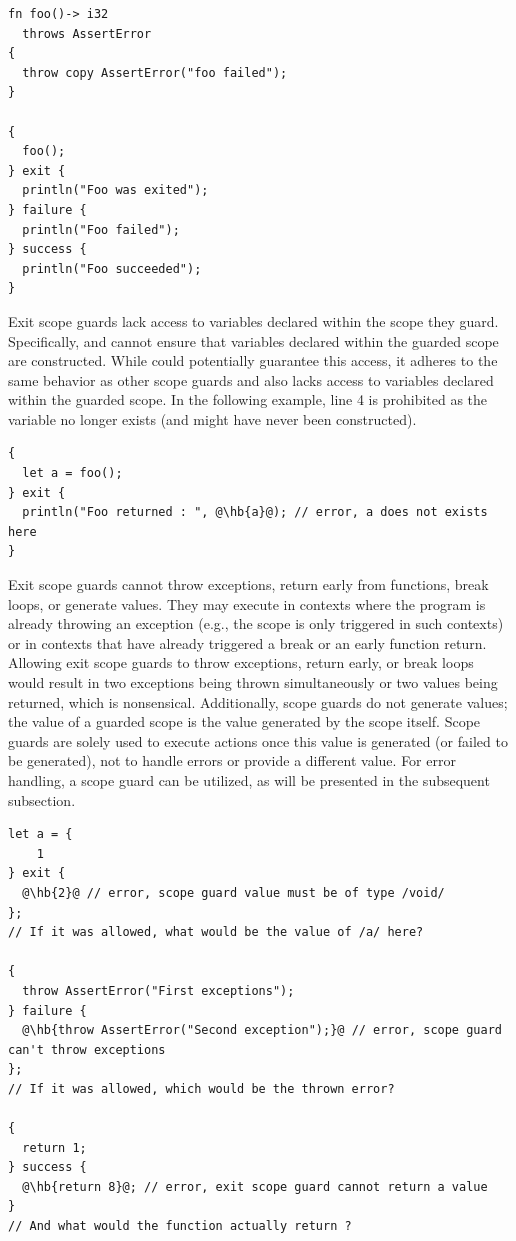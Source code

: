 \begin{lstlisting}[style=coloredverbatim]
fn foo()-> i32
  throws AssertError
{
  throw copy AssertError("foo failed");
}

{
  foo();
} exit {
  println("Foo was exited");
} failure {
  println("Foo failed");
} success {
  println("Foo succeeded");
}
\end{lstlisting}

Exit scope guards lack access to variables declared within the scope they guard.
Specifically,  and  cannot ensure that variables
declared within the guarded scope are constructed. While  could
potentially guarantee this access, it adheres to the same behavior as other
scope guards and also lacks access to variables declared within the guarded
scope. In the following example, line 4 is prohibited as the variable 
no longer exists (and might have never been constructed).

\begin{lstlisting}[style=coloredverbatim, escapechar=@]
{
  let a = foo();
} exit {
  println("Foo returned : ", @\hb{a}@); // error, a does not exists here
}
\end{lstlisting}

Exit scope guards cannot throw exceptions, return early from functions, break
loops, or generate values. They may execute in contexts where the program is
already throwing an exception (e.g., the  scope is only triggered
in such contexts) or in contexts that have already triggered a break or an early
function return. Allowing exit scope guards to throw exceptions, return early,
or break loops would result in two exceptions being thrown simultaneously or two
values being returned, which is nonsensical. Additionally, scope guards do not
generate values; the value of a guarded scope is the value generated by the
scope itself. Scope guards are solely used to execute actions once this value is
generated (or failed to be generated), not to handle errors or provide a
different value. For error handling, a  scope guard can be
utilized, as will be presented in the subsequent subsection.

\begin{lstlisting}[style=coloredverbatim, escapechar=@]
let a = {
    1
} exit {
  @\hb{2}@ // error, scope guard value must be of type /void/
};
// If it was allowed, what would be the value of /a/ here?

{
  throw AssertError("First exceptions");
} failure {
  @\hb{throw AssertError("Second exception");}@ // error, scope guard can't throw exceptions
};
// If it was allowed, which would be the thrown error?

{
  return 1;
} success {
  @\hb{return 8}@; // error, exit scope guard cannot return a value
}
// And what would the function actually return ?
\end{lstlisting}

